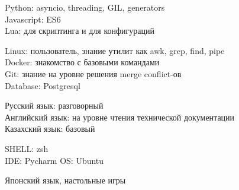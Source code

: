 \documentclass[10pt]{article} %
\begin{document}
{
  Python: asyncio, threading, GIL, generators\\
  Javascript: ES6\\
  Lua: для скриптинга и для конфигураций
}

{
  Linux: пользователь, знание утилит как awk, grep, find, pipe\\
  Docker: знакомство с базовыми командами\\
  Git: знание на уровне решения merge conflict-ов\\
  Database: Postgresql
}

{
  Русский язык: разговорный\\
  Английский язык: на уровне чтения технической документации \\
  Казахский язык: базовый
}


{
  SHELL: zsh\\
  IDE: Pycharm
  OS: Ubuntu
}

{
  Японский язык, настольные игры
}
\end{document}
